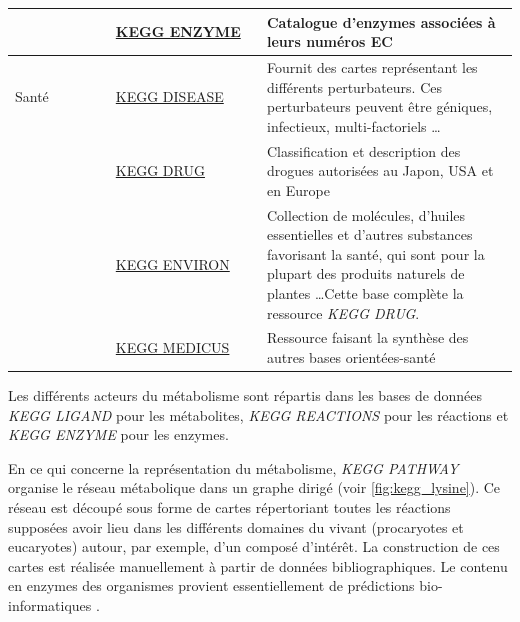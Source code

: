 \begin{refsegment}
\begin{table}[H]
\begin{tabular}{p{0.2\linewidth}|p{0.3\linewidth}|p{0.5\linewidth}}
            \cline{2-3}             & \href{http://www.genome.jp/kegg/annotation/enzyme.html}{KEGG ENZYME}  & Catalogue d'enzymes associées                                                                                                                                                                                                                                                                                               à leurs numéros \acrfull{EC}\\
            \hline
            Santé                   & \href{http://www.genome.jp/kegg/disease/}{KEGG DISEASE}               & Fournit des cartes représentant les différents perturbateurs. Ces perturbateurs peuvent être géniques, infectieux, multi-factoriels \ldots\\
            \cline{2-3}             & \href{http://www.genome.jp/kegg/drug/}{KEGG DRUG}                     & Classification et description des drogues autorisées au Japon, USA et en Europe\\
            \cline{2-3}             & \href{http://www.genome.jp/kegg/drug/environ.html}{KEGG ENVIRON}      & Collection de molécules, d'huiles essentielles et d'autres substances favorisant la santé, qui sont pour la plupart des produits naturels de plantes \ldots Cette base complète la ressource \textit{KEGG DRUG}.\\
            \cline{2-3}             & \href{http://www.genome.jp/kegg/medicus.html}{KEGG MEDICUS}           & Ressource faisant la synthèse des autres  bases orientées-santé \\
            \bottomrule
        \end{tabular}
    \end{table}
    
    
    Les différents acteurs du métabolisme sont répartis dans les bases de données \textit{KEGG LIGAND} pour les métabolites, \textit{KEGG REACTIONS} pour les réactions et \textit{KEGG ENZYME} pour les enzymes.
    
    En ce qui concerne la représentation du métabolisme, \textit{KEGG PATHWAY} organise le réseau métabolique dans un graphe dirigé (voir \cref{fig:kegg_lysine}). Ce réseau est découpé sous forme de cartes répertoriant toutes les réactions supposées avoir lieu dans les différents domaines du vivant (procaryotes et eucaryotes) autour, par exemple, d'un composé d'intérêt. La construction de ces cartes est réalisée manuellement à partir de données bibliographiques. Le contenu en enzymes des organismes provient essentiellement de prédictions bio-informatiques .
    

\end{refsegment}

